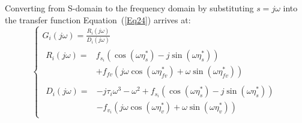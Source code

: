 \documentclass[journal]{IEEEtran}
\begin{document}
Converting from S-domain to the frequency domain by substituting $s=j\omega$ into the transfer function Equation~(\ref{Eq24}) arrives at:
\begin{equation}
  \left\{\begin{array}{l}
    G_{i}(j \omega)=\frac{R_{i}(j \omega)}{D_{i}(j \omega)} \\
    \begin{aligned}
      R_{i}(j \omega)= & f_{s_{i}}\left(\cos \left(\omega \eta_{s}^{*}\right)-j \sin \left(\omega \eta_{s}^{*}\right)\right) \\
                       & +f_{f v}\left(j \omega \cos \left(\omega \eta_{f v}^{*}\right)
      +\omega \sin \left(\omega \eta_{f v}^{*}\right)\right)
    \end{aligned}                              \\
    \begin{aligned}
      D_{i}(j \omega)= & -j \tau_{i} \omega^{3}-\omega^{2}+f_{s_{i}}\left(\cos \left(\omega \eta_{s}^{*}\right)-j \sin \left(\omega \eta_{s}^{*}\right)\right) \\
                       & -f_{v_{i}}\left(j \omega \cos \left(\omega \eta_{v}^{*}\right)+\omega \sin \left(\omega \eta_{v}^{*}\right)\right)
    \end{aligned}
  \end{array}\right.
  \label{Eq27}
\end{equation}
\end{document}
